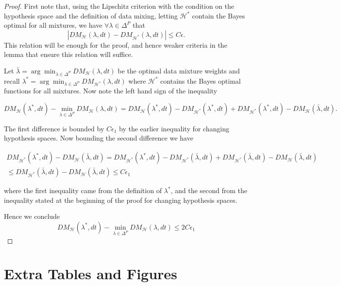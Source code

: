 \begin{proof}
    First note that, using the Lipschitz criterion with the condition on the hypothesis space and the definition of data mixing, letting $\mathcal{H}^*$ contain the Bayes optimal for all mixtures, we have $\forall \lambda \in \Delta^P$ that  $$|DM_{\mathcal{H}}(\lambda,dt) - DM_{\mathcal{H}^*}(\lambda,dt)| \leq C\epsilon.$$ %
    This relation will be enough for the proof, and hence weaker criteria in the lemma that ensure this relation will suffice.
    

    Let $\bar{\lambda} = \arg\min_{\lambda \in \Delta^P} DM_{\mathcal{H}}(\lambda, dt)$ be the optimal data mixture weights and recall $\lambda^* = \arg \min_{\lambda \in \Delta^P} DM_{\mathcal{H}^*}(\lambda, dt)$ where $\mathcal{H}^*$ contains the Bayes optimal functions for all mixtures. Now note the left hand sign of the inequality 

    $$
        DM_{\mathcal{H}}(\lambda^*, dt) - \min_{\lambda \in \Delta^P} DM_{\mathcal{H}}(\lambda, dt) =  DM_{\mathcal{H}}(\lambda^*, dt) - DM_{\mathcal{H}^*}(\lambda^*, dt) + DM_{\mathcal{H}^*}(\lambda^*, dt) - DM_{\mathcal{H}}(\bar{\lambda}, dt).
    $$
    

    The first difference is bounded by $C\epsilon_1$ by the earlier inequality for changing hypothesis spaces. Now bounding the second difference we have

    \begin{multline*}
        DM_{\mathcal{H}^*}(\lambda^*, dt) -DM_{\mathcal{H}}(\bar{\lambda}, dt)  = DM_{\mathcal{H}^*}(\lambda^*, dt) - DM_{\mathcal{H}^*}(\bar{\lambda}, dt)  + DM_{\mathcal{H}^*}(\bar{\lambda}, dt) - DM_{\mathcal{H}}(\bar{\lambda}, dt) \\ \leq DM_{\mathcal{H}^*}(\bar{\lambda}, dt) - DM_{\mathcal{H}}(\bar{\lambda}, dt) \leq C \epsilon_1
    \end{multline*}


    where the first inequality came from the definition of $\lambda^*$, and the second from the inequality stated at the beginning of the proof for changing hypothesis spaces.

    Hence we conclude $$DM_{\mathcal{H}}(\lambda^*, dt) - \min_{\lambda \in \Delta^P} DM_{\mathcal{H}}(\lambda, dt) \leq 2C\epsilon_1$$
\end{proof}





\section{Extra Tables and Figures}
\label{app:figures}


